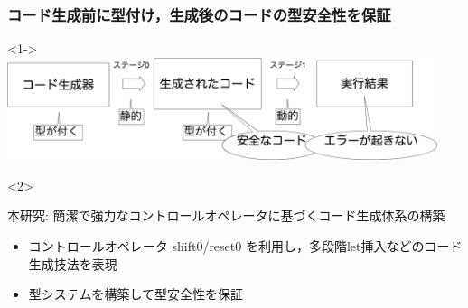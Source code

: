 \begin{frame}
  \frametitle{コード生成前に型付け，生成後のコードの型安全性を保証}




  \begin{onlyenv}<1->
    \center
    \includegraphics[clip,height=3.0cm]{./img/prggen_type4.png}
  \end{onlyenv}

  \begin{uncoverenv}<2>
    \begin{block}{本研究: 簡潔で強力なコントロールオペレータに基づくコード生成体系の構築}
      \begin{itemize}
      \item コントロールオペレータ shift0/reset0 を利用し，多段階let挿入などのコード生成技法を表現
      \item 型システムを構築して型安全性を保証
      \end{itemize}
    \end{block}
  \end{uncoverenv}

\end{frame}


